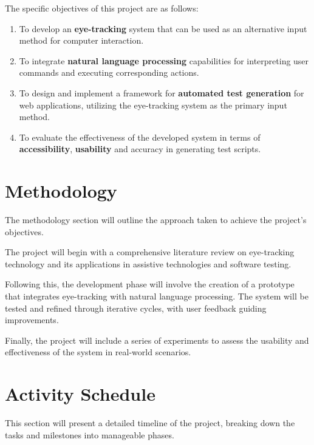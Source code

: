 \documentclass[letterpaper, 12pt]{article}
\begin{document}
The specific objectives of this project are as follows:
\begin{enumerate}

\item To develop an \textbf{eye-tracking} system that can be used as an alternative input method for computer interaction.

\item To integrate \textbf{natural language processing} capabilities for interpreting user commands and executing corresponding actions.

\item To design and implement a framework for \textbf{automated test generation} for web applications, utilizing the eye-tracking system as the primary input method. 

\item To evaluate the effectiveness of the developed system in terms of \textbf{accessibility}, \textbf{usability} and accuracy in generating test scripts.


\end{enumerate}

\section{Methodology}

The methodology section will outline the approach taken to achieve the project's objectives. 
\newline

\noindent The project will begin with a comprehensive literature review on eye-tracking technology and its applications in assistive technologies and software testing. 
\newline

\noindent Following this, the development phase will involve the creation of a prototype that integrates eye-tracking with natural language processing. The system will be tested and refined through iterative cycles, with user feedback guiding improvements. 
\newline


\noindent Finally, the project will include a series of experiments to assess the usability and effectiveness of the system in real-world scenarios.

\section{Activity Schedule}

This section will present a detailed timeline of the project, breaking down the tasks and milestones into manageable phases. 
\end{document}
